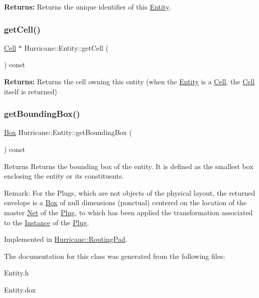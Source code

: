 {\bfseries Returns\+:} Returns the unique identifier of this \mbox{\hyperlink{classHurricane_1_1Entity}{Entity}}. \mbox{\label{classHurricane_1_1Entity_a42bdf015f583be477cc54b48652b1007}} 
\subsubsection{\texorpdfstring{get\+Cell()}{getCell()}}
{\footnotesize\ttfamily \mbox{\hyperlink{classHurricane_1_1Cell}{Cell}} $\ast$ Hurricane\+::\+Entity\+::get\+Cell (\begin{DoxyParamCaption}{ }\end{DoxyParamCaption}) const\hspace{0.3cm}{\ttfamily [pure virtual]}}

{\bfseries Returns\+:} Returns the cell owning this entity (when the \mbox{\hyperlink{classHurricane_1_1Entity}{Entity}} is a \mbox{\hyperlink{classHurricane_1_1Cell}{Cell}}, the \mbox{\hyperlink{classHurricane_1_1Cell}{Cell}} itself is returned) \mbox{\label{classHurricane_1_1Entity_ad834f8ce33a08a13e2a88446696e63e7}} 
\subsubsection{\texorpdfstring{get\+Bounding\+Box()}{getBoundingBox()}}
{\footnotesize\ttfamily \mbox{\hyperlink{classHurricane_1_1Box}{Box}} Hurricane\+::\+Entity\+::get\+Bounding\+Box (\begin{DoxyParamCaption}{ }\end{DoxyParamCaption}) const\hspace{0.3cm}{\ttfamily [pure virtual]}}

\begin{DoxyReturn}{Returns}
Returns the bounding box of the entity. It is defined as the smallest box enclosing the entity or its constituents.
\end{DoxyReturn}
\begin{DoxyParagraph}{Remark\+: For the Plugs, which are not objects of the physical layout,}
the returned envelope is a \mbox{\hyperlink{classHurricane_1_1Box}{Box}} of null dimensions (ponctual) centered on the location of the master \mbox{\hyperlink{classHurricane_1_1Net}{Net}} of the \mbox{\hyperlink{classHurricane_1_1Plug}{Plug}}, to which has been applied the transformation associated to the \mbox{\hyperlink{classHurricane_1_1Instance}{Instance}} of the \mbox{\hyperlink{classHurricane_1_1Plug}{Plug}}. 
\end{DoxyParagraph}


Implemented in \mbox{\hyperlink{classHurricane_1_1RoutingPad_a2cc2894b5e1c82b725dedcf1978dc773}{Hurricane\+::\+Routing\+Pad}}.



The documentation for this class was generated from the following files\+:\begin{DoxyCompactItemize}
\item 
Entity.\+h\item 
Entity.\+dox\end{DoxyCompactItemize}
